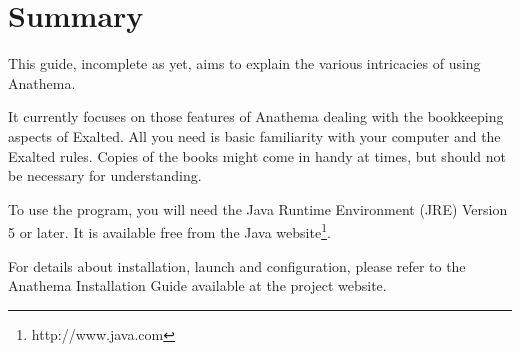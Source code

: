 \chapter{Summary}
This guide, incomplete as yet, aims to explain the various intricacies of using Anathema.

It currently focuses on those features of Anathema dealing with the bookkeeping aspects of Exalted. All you need is basic familiarity with your computer and the Exalted rules. Copies of the books might come in handy at times, but should not be necessary for understanding.

To use the program, you will need the Java Runtime Environment (JRE) Version 5 or later. It is available free from the Java website\footnote{http://www.java.com}.

For details about installation, launch and configuration, please refer to the Anathema Installation Guide available at the project website.
